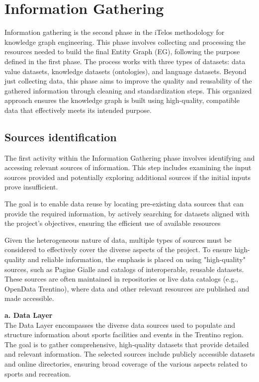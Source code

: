 \section{Information Gathering}
Information gathering is the second phase in the iTelos methodology for knowledge graph engineering. This phase involves collecting and processing the resources needed to build the final Entity Graph (EG), following the purpose defined in the first phase. The process works with three types of datasets: data value datasets, knowledge datasets (ontologies), and language datasets. Beyond just collecting data, this phase aims to improve the quality and reusability of the gathered information through cleaning and standardization steps. This organized approach ensures the knowledge graph is built using high-quality, compatible data that effectively meets its intended purpose.

\subsection{Sources identification}
The first activity within the Information Gathering phase involves identifying and accessing relevant sources of information. This step includes examining the input sources provided and potentially exploring additional sources if the initial inputs prove insufficient.

\vspace{0.4cm}
\noindent The goal is to enable data reuse by locating pre-existing data sources that can provide the required information, by actively searching for datasets aligned with the project's objectives, ensuring the efficient use of available resources

\noindent Given the heterogeneous nature of data, multiple types of sources must be considered to effectively cover the diverse aspects of the project. To ensure high-quality and reliable information, the emphasis is placed on using "high-quality" sources, such as Pagine Gialle and catalogs of interoperable, reusable datasets. These sources are often maintained in repositories or live data catalogs (e.g., OpenData Trentino), where data and other relevant resources are published and made accessible.
\vspace{0.4cm}

\noindent\textbf{a. Data Layer\\}
\noindent The Data Layer encompasses the diverse data sources used to populate and structure information about sports facilities and events in the Trentino region. The goal is to gather comprehensive, high-quality datasets that provide detailed and relevant information. The selected sources include publicly accessible datasets and online directories, ensuring broad coverage of the various aspects related to sports and recreation. 
\vspace{0.4cm}

